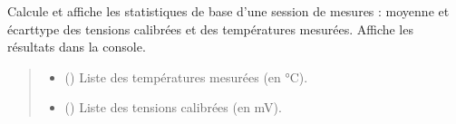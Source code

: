 \documentclass[letterpaper,10pt,english]{sphinxmanual}
\begin{document}

\begin{fulllineitems}
\label{\detokenize{Mesure:Mesure.informations_1er_ordre}}
\pysigstartsignatures
\pysiglinewithargsret
{}
{\sphinxparamcomma {}\sphinxparamcomma {}}
{}
\pysigstopsignatures
\sphinxAtStartPar

Calcule et affiche les statistiques de base d’une session de mesures : moyenne et écart\sphinxhyphen{}type
des tensions calibrées et des températures mesurées. Affiche les résultats dans la console.
\begin{quote}\begin{description}
\begin{itemize}
\item {} 
\sphinxAtStartPar
{} (\sphinxstyleliteralemphasis{\sphinxupquote{{[}}}\sphinxstyleliteralemphasis{\sphinxupquote{{]}}}) \textendash{} Liste des températures mesurées (en °C).

\item {} 
\sphinxAtStartPar
{} (\sphinxstyleliteralemphasis{\sphinxupquote{{[}}}\sphinxstyleliteralemphasis{\sphinxupquote{{]}}}) \textendash{} Liste des tensions calibrées (en mV).

\end{itemize}

\end{description}\end{quote}

\end{fulllineitems}


\begin{fulllineitems}
\label{\detokenize{Mesure:Mesure.t_attente}}
\pysigstartsignatures
\pysiglinewithargsret
{}
{}
{}
\pysigstopsignatures
\end{fulllineitems}
\end{document}
